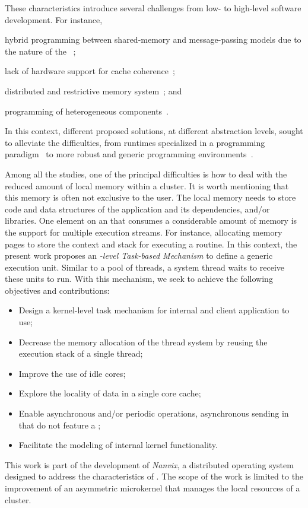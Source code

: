 	These characteristics introduce several challenges from low- to high-level
	software development. For instance,
	\begin{enumerate*}[label=(\roman*)]
		\item hybrid programming between shared-memory and message-passing
			models due to the nature of the \lws~\cite{kelly2013};
		\item lack of hardware support for cache coherence~\cite{francesquini2015};
		\item distributed and restrictive memory system~\cite{Castro2016}; and
		\item programming of heterogeneous components~\cite{Barbalace2015}.
	\end{enumerate*}
	In this context, different proposed solutions, at different abstraction
	levels, sought to alleviate the difficulties, from runtimes specialized in
	a programming paradigm~\cite{Zhou:coroutine, Cesarini:task} to more robust
	and generic programming environments~\cite{Penna:Microkernel}.

	Among all the studies, one of the principal difficulties is how to deal
	with the reduced amount of local memory within a cluster. It is worth
	mentioning that this memory is often not exclusive to the user. The local
	memory needs to store code and data structures of the application and its
	dependencies, \eg \os and/or libraries. One element on an \os that consumes
	a considerable amount of memory is the support for multiple execution
	streams. For instance, allocating memory pages to store the context and
	stack for executing a routine.
	In this context, the present work proposes an \textit{\os-level Task-based
	Mechanism} to define a generic execution unit.  Similar to a pool of
	threads, a system thread waits to receive these units to run.
	With this mechanism, we seek to achieve the following objectives
	and contributions:
	\begin{itemize}
		\item Design a kernel-level task mechanism for internal \os and client
			application to use;
		\item Decrease the memory allocation of the thread system by reusing
			the execution stack of a single thread;
		\item Improve the use of idle cores;
		\item Explore the locality of data in a single core cache;
		\item Enable asynchronous and/or periodic operations, \eg
			asynchronous sending in \lws that do not feature a \dma;
		\item Facilitate the modeling of internal kernel functionality.
	\end{itemize}
	This work is part of the development of \textit{Nanvix}, a distributed
	operating system designed to address the characteristics of \lws. The scope
	of the work is limited to the improvement of an asymmetric microkernel that
	manages the local resources of a cluster.

